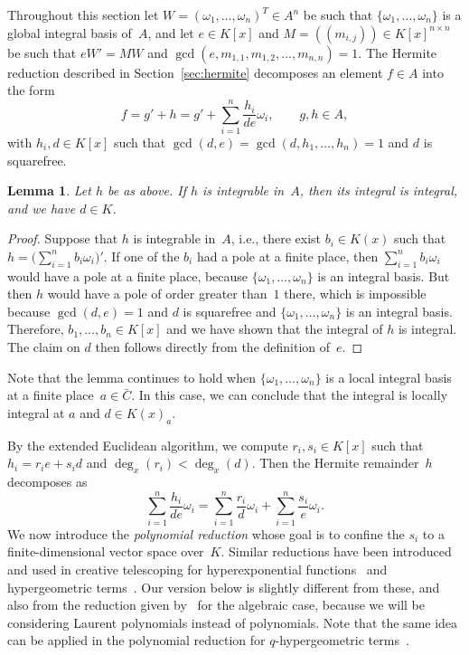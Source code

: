 \documentclass[final,1p,times,authoryear]{elsarticle}
\newtheorem{lemma}[theorem]{Lemma}
\begin{document}
Throughout this section let $W=(\omega_1,\ldots,\omega_n)^T\in A^n$ be such
that $\{\omega_1, \ldots, \omega_n\}$ is a global integral basis of~$A$, and
let $e\in K[x]$ and $M=((m_{i,j}))\in K[x]^{n\times n}$ be such that $eW'=MW$
and $\gcd(e, m_{1, 1}, m_{1, 2}, \ldots, m_{n ,n})=1$. The Hermite reduction
described in Section~\ref{sec:hermite} decomposes an element $f\in A$ into
the form
\[
  f = g' + h = g' + \sum_{i=1}^n \frac{h_i}{de} \omega_i,\qquad
  g, h\in A,
\]
with $h_i, d\in K[x]$ such that $\gcd(d, e)=\gcd(d,h_1,\dots,h_n)=1$ and $d$ is squarefree.
\begin{lemma}\label{LEM:d}
  Let $h$ be as above. If $h$ is integrable in~$A$,
  then its integral is integral, and we have $d\in K$.
\end{lemma}
\begin{proof}
  Suppose that $h$ is integrable in~$A$, i.e., there exist $b_i\in K(x)$
  such that $h = \bigl(\sum_{i=1}^n b_i \omega_i\bigr)'$.
  If one of the $b_i$ had a pole at a finite place, then $\sum_{i=1}^n b_i\omega_i$
  would have a pole at a finite place, because $\{\omega_1,\dots,\omega_n\}$ is
  an integral basis. But then $h$ would have a pole of order greater than~$1$
  there, which is impossible because $\gcd(d,e)=1$ and $d$ is squarefree and
  $\{\omega_1,\dots,\omega_n\}$ is an integral basis.
  Therefore, $b_1,\dots,b_n\in K[x]$ and we have shown that the integral of $h$
  is integral. The claim on $d$ then follows directly from the definition of~$e$.
\end{proof}

Note that the lemma continues to hold when $\{\omega_1,\dots,\omega_n\}$ is
a local integral basis at a finite place~$a\in\bar C$. In this case, we can conclude
that the integral is locally integral at $a$ and $d\in K(x)_a$.

By the extended Euclidean algorithm, we compute $r_i, s_i\in K[x]$ such that
$h_i = r_i e + s_i d$ and $\deg_x(r_i) < \deg_x(d)$. Then the Hermite remainder~$h$
decomposes as
\begin{equation}\label{EQ:h}
  \sum_{i=1}^n \frac{h_i}{de}\omega_i =
  \sum_{i=1}^n \frac{r_i}{d}\omega_i +
  \sum_{i=1}^n \frac{s_i}{e}\omega_i.
\end{equation}
We now introduce the \emph{polynomial reduction} whose goal is to confine the $s_i$ to a finite-dimensional
vector space over~$K$. Similar reductions have been introduced and used in creative telescoping
for hyperexponential functions~\citep{bostan13a} and hypergeometric terms~\citep{chen15a}.
Our version below is slightly different from these, and also from the reduction given by~\cite{chen16} for
the algebraic case, because we will be considering Laurent polynomials instead of polynomials.
Note that the same idea can be applied in the polynomial reduction for $q$-hypergeometric terms~\cite{du16}.
\end{document}
